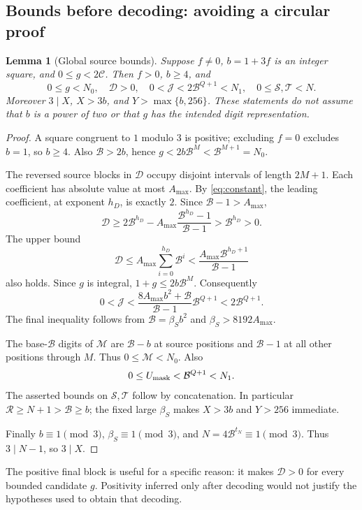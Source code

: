 \documentclass[11pt,a4paper]{article}
\newtheorem{lemma}[theorem]{Lemma}
\theoremstyle{remark}
\newcommand{\B}{\mathcal B}
\newcommand{\Dc}{\mathcal D}
\newcommand{\Mc}{\mathcal M}
\newcommand{\Tc}{\mathcal T}
\newcommand{\Jc}{\mathcal J}
\newcommand{\Sc}{\mathcal S}
\newcommand{\Rc}{\mathcal R}
\renewcommand{\Cap}{\mathscr C}
\begin{document}
\subsection{Bounds before decoding: avoiding a circular proof}
\begin{lemma}[Global source bounds]\label{lem:global}
Suppose \(f\ne0\), \(b=1+3f\) is an integer square, and
\(0\le g<2\Cap\). Then \(f>0\), \(b\ge4\), and
\[
0\le g<N_0,\quad \Dc>0,\quad
0<\Jc<2\B^{Q+1}<N_1,\quad 0\le\Sc,\Tc<N.
\]
Moreover \(3\mid X\), \(X>3b\), and \(Y>\max\{b,256\}\).
These statements do not assume that \(b\) is a power of two or that
\(g\) has the intended digit representation.
\end{lemma}
\begin{proof}
A square congruent to \(1\) modulo \(3\) is positive; excluding \(f=0\)
excludes \(b=1\), so \(b\ge4\). Also \(\B>2b\), hence
\(g<2b\B^M<\B^{M+1}=N_0\).

The reversed source blocks in \(\Dc\) occupy disjoint intervals of
length \(2M+1\). Each coefficient has absolute value at most \(A_{\max}\).
By \eqref{eq:constant}, the leading coefficient, at exponent \(h_D\),
is exactly \(2\). Since \(\B-1>A_{\max}\),
\[
\Dc\ge 2\B^{h_D}
-A_{\max}\frac{\B^{h_D}-1}{\B-1}>\B^{h_D}>0.
\]
The upper bound
\[
\Dc\le A_{\max}\sum_{i=0}^{h_D}\B^i
<\frac{A_{\max}\B^{h_D+1}}{\B-1}
\]
also holds. Since \(g\) is integral, \(1+g\le2b\B^M\).
Consequently
\[
0<\Jc<
\frac{8A_{\max}b^2+\B}{\B-1}\B^{Q+1}
<2\B^{Q+1}.
\]
The final inequality follows from \(\B=\beta_Sb^2\) and
\(\beta_S>8192A_{\max}\).

The base-\(\B\) digits of \(\Mc\) are \(\B-b\) at source
positions and \(\B-1\) at all other positions through \(M\).
Thus \(0\le\Mc<N_0\). Also
\[
0\le U_{\rm mask}<\B^{Q+1}<N_1.
\]
The asserted bounds on \(\Sc,\Tc\) follow by concatenation.
In particular \(\Rc\ge N+1>\B\ge b\); the fixed large \(\beta_S\)
makes \(X>3b\) and \(Y>256\) immediate.

Finally \(b\equiv1\pmod3\), \(\beta_S\equiv1\pmod3\), and
\(N=4\B^{t_N}\equiv1\pmod3\). Thus \(3\mid N-1\), so \(3\mid X\).
\end{proof}
The positive final block is useful for a specific reason: it makes
\(\Dc>0\) for every bounded candidate \(g\). Positivity inferred only
after decoding would not justify the hypotheses used to obtain that
decoding.
\end{document}
